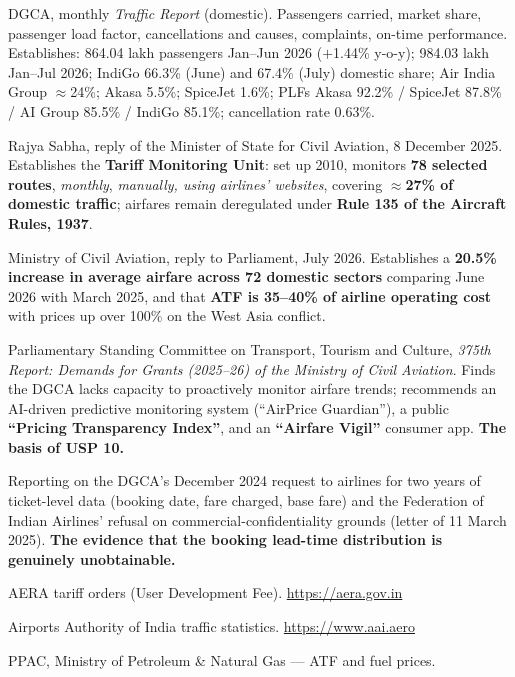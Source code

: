 \begin{enumerate}[label={[\arabic*]},start=10]
\item DGCA, monthly \emph{Traffic Report} (domestic). Passengers carried, market share,
passenger load factor, cancellations and causes, complaints, on-time performance.
Establishes: 864.04 lakh passengers Jan--Jun 2026 ($+$1.44\% y-o-y); 984.03 lakh Jan--Jul
2026; IndiGo 66.3\% (June) and 67.4\% (July) domestic share; Air India Group $\approx$24\%;
Akasa 5.5\%; SpiceJet 1.6\%; PLFs Akasa 92.2\% / SpiceJet 87.8\% / AI Group 85.5\% / IndiGo
85.1\%; cancellation rate 0.63\%.\\

\item Rajya Sabha, reply of the Minister of State for Civil Aviation, 8 December 2025.
Establishes the \textbf{Tariff Monitoring Unit}: set up 2010, monitors \textbf{78 selected
routes}, \emph{monthly}, \emph{manually, using airlines' websites}, covering
\textbf{$\approx$27\% of domestic traffic}; airfares remain deregulated under \textbf{Rule
135 of the Aircraft Rules, 1937}.

\item Ministry of Civil Aviation, reply to Parliament, July 2026. Establishes a
\textbf{20.5\% increase in average airfare across 72 domestic sectors} comparing June 2026
with March 2025, and that \textbf{ATF is 35--40\% of airline operating cost} with prices up
over 100\% on the West Asia conflict.

\item Parliamentary Standing Committee on Transport, Tourism and Culture, \emph{375th
Report: Demands for Grants (2025--26) of the Ministry of Civil Aviation}. Finds the DGCA
lacks capacity to proactively monitor airfare trends; recommends an AI-driven predictive
monitoring system (``AirPrice Guardian''), a public \textbf{``Pricing Transparency Index''},
and an \textbf{``Airfare Vigil''} consumer app. \textbf{The basis of USP 10.}

\item Reporting on the DGCA's December 2024 request to airlines for two years of
ticket-level data (booking date, fare charged, base fare) and the Federation of Indian
Airlines' refusal on commercial-confidentiality grounds (letter of 11 March 2025).
\textbf{The evidence that the booking lead-time distribution is genuinely unobtainable.}

\item AERA tariff orders (User Development Fee). \url{https://aera.gov.in}
\item Airports Authority of India traffic statistics. \url{https://www.aai.aero}
\item PPAC, Ministry of Petroleum \& Natural Gas --- ATF and fuel prices.
\end{enumerate}

